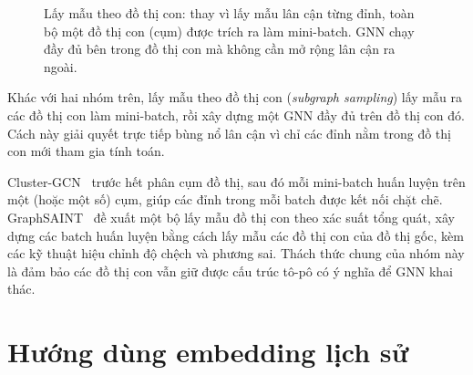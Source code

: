 \begin{figure}[htbp]
{}
\caption{Lấy mẫu theo đồ thị con: thay vì lấy mẫu lân cận từng đỉnh, toàn bộ một đồ thị con (cụm) được trích ra làm mini-batch. GNN chạy đầy đủ bên trong đồ thị con mà không cần mở rộng lân cận ra ngoài.}
\label{fig:subgraph-sampling}
\end{figure}

Khác với hai nhóm trên, lấy mẫu theo đồ thị con (\textit{subgraph sampling}) lấy mẫu ra các đồ thị con làm mini-batch, rồi xây dựng một GNN đầy đủ trên đồ thị con đó. Cách này giải quyết trực tiếp bùng nổ lân cận vì chỉ các đỉnh nằm trong đồ thị con mới tham gia tính toán.

Cluster-GCN~\cite{Chiang2019ClusterGCN} trước hết phân cụm đồ thị, sau đó mỗi mini-batch huấn luyện trên một (hoặc một số) cụm, giúp các đỉnh trong mỗi batch được kết nối chặt chẽ. GraphSAINT~\cite{Zeng2020GraphSAINT} đề xuất một bộ lấy mẫu đồ thị con theo xác suất tổng quát, xây dựng các batch huấn luyện bằng cách lấy mẫu các đồ thị con của đồ thị gốc, kèm các kỹ thuật hiệu chỉnh độ chệch và phương sai. Thách thức chung của nhóm này là đảm bảo các đồ thị con vẫn giữ được cấu trúc tô-pô có ý nghĩa để GNN khai thác.

\section{Hướng dùng embedding lịch sử}

